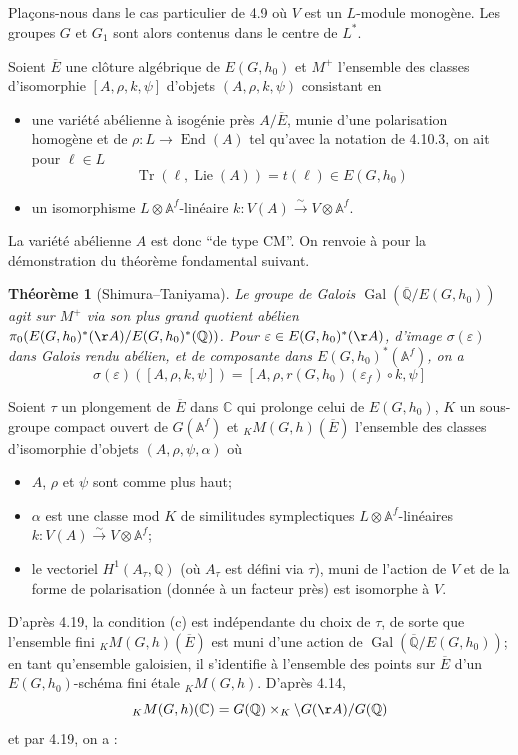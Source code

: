 \documentclass[11pt]{amsart}
\theoremstyle{plain}
\newtheorem{theorem}{Th\'eor\`eme}[section]
\theoremstyle{definition}
\DeclareMathOperator{\Lie}{Lie}
\DeclareMathOperator{\End}{End}
\DeclareMathOperator{\Gal}{Gal}
\DeclareMathOperator{\Tr}{Tr}
\newcommand{\QQ}{\mathbb{Q}}
\newcommand{\CC}{\mathbb{C}}
\newcommand{\AAf}{\mathbb{A}^f}
\begin{document}
\subsection{}

Pla\c cons-nous dans le cas particulier de 4.9 o\`u $V$ est un $L$-module monog\`ene. Les groupes $G$ et $G_1$ sont alors contenus dans le centre de $L^*$.

Soient $\overline{E}$ une cl\^oture alg\'ebrique de $E(G,h_0)$ et $M^+$ l'ensemble des classes d'isomorphie $[A, \rho, k, \psi]$ d'objets $(A, \rho, k, \psi)$ consistant en
\begin{itemize}
\item[(a)] une vari\'et\'e ab\'elienne \`a isog\'enie pr\`es $A/\overline{E}$, munie d'une polarisation homog\`ene et de $\rho : L \to \End(A)$ tel qu'avec la notation de 4.10.3, on ait pour $\ell \in L$
\[
\Tr(\ell, \Lie(A)) = t(\ell) \in E(G,h_0)
\]
\item[(b)] un isomorphisme $L \otimes \AAf$-lin\'eaire $k : V(A) \xrightarrow{\sim} V \otimes \AAf$.
\end{itemize}
La vari\'et\'e ab\'elienne $A$ est donc ``de type CM''. On renvoie \`a \cite{ST} pour la d\'emonstration du th\'eor\`eme fondamental suivant.

\begin{theorem}[Shimura--Taniyama]
Le groupe de Galois $\Gal(\overline{\QQ}/E(G,h_0))$ agit sur $M^+$ via son plus grand quotient ab\'elien $\pi_0(E(G,h_0)^*(\AA)/E(G,h_0)^*(\QQ))$. Pour $\varepsilon \in E(G,h_0)^*(\AA)$, d'image $\sigma(\varepsilon)$ dans Galois rendu ab\'elien, et de composante dans $E(G,h_0)^*(\AAf)$, on a
\begin{equation}\label{eq:4.19.1}
\sigma(\varepsilon)([A, \rho, k, \psi]) = [A, \rho, r(G,h_0)(\varepsilon_f) \circ k, \psi]
\end{equation}
\end{theorem}

Soient $\tau$ un plongement de $\overline{E}$ dans $\CC$ qui prolonge celui de $E(G,h_0)$, $K$ un sous-groupe compact ouvert de $G(\AAf)$ et ${}_K M(G,h)(\overline{E})$ l'ensemble des classes d'isomorphie d'objets $(A, \rho, \psi, \alpha)$ o\`u
\begin{itemize}
\item[(a)] $A$, $\rho$ et $\psi$ sont comme plus haut;
\item[(b)] $\alpha$ est une classe mod $K$ de similitudes symplectiques $L \otimes \AAf$-lin\'eaires $k : V(A) \xrightarrow{\sim} V \otimes \AAf$;
\item[(c)] le vectoriel $H^1(A_\tau, \QQ)$ (o\`u $A_\tau$ est d\'efini via $\tau$), muni de l'action de $V$ et de la forme de polarisation (donn\'ee \`a un facteur pr\`es) est isomorphe \`a $V$.
\end{itemize}
D'apr\`es 4.19, la condition (c) est ind\'ependante du choix de $\tau$, de sorte que l'ensemble fini ${}_K M(G,h)(\overline{E})$ est muni d'une action de $\Gal(\overline{\QQ}/E(G,h_0))$; en tant qu'ensemble galoisien, il s'identifie \`a l'ensemble des points sur $\overline{E}$ d'un $E(G,h_0)$-sch\'ema fini \'etale ${}_K M(G,h)$. D'apr\`es 4.14,
\[
{}_K M(G,h)(\CC) = G(\QQ) \times_K \backslash G(\AA)/G(\QQ)
\]
et par 4.19, on a :
\end{document}
